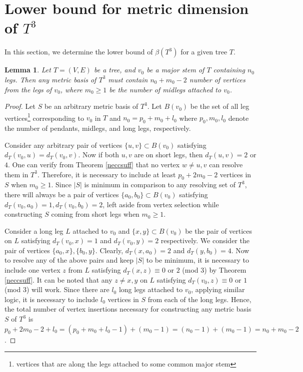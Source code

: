 \documentclass{article}
\newtheorem{lem}[thm]{Lemma}
\theoremstyle{definition}
\numberwithin{equation}{section}
\begin{document}
\section{Lower bound for metric dimension of $T^{3}$} 

\noindent In this section, we determine the lower bound of $\beta{(T^{3})}$ for a given tree $T$.


\begin{lem}\label{7}
Let $T=(V,E)$ be a tree, and $v_{0}$ be a major stem of $T$ containing $n_{0}$ legs. Then any metric basis of $T^{3}$ must contain $n_{0}+m_{0}-2$ number of vertices from the legs of $v_{0}$, where $m_{0}\geq 1$ be the number of midlegs attached to $v_{0}$.  
\end{lem}

\begin{proof}
Let $S$ be an arbitrary metric basis of $T^{3}$.  Let $B(v_{0})$ be the set of all leg vertices\footnote{vertices that are along the legs attached to some common major stem} corresponding to $v_{0}$ in $T$ and $n_{0}=p_{0}+m_{0}+l_{0}$ where $p_{0},m_{0},l_{0}$ denote the number of pendants, midlegs, and long legs, respectively.
\vspace{0.4em}

Consider any arbitrary pair of vertices $\{u,v\}\subset B(v_{0})$ satisfying $d_{T}(v_{0},u)=d_{T}(v_{0},v)$. Now if both $u,v$ are on short legs, then $d_{T}(u,v)=2$ or $4$. One can verify from Theorem \ref{neccsuff} that no vertex $w\neq u,v$ can resolve them in $T^{3}$. Therefore, it is necessary to include at least $p_{0}+2m_{0}-2$ vertices in $S$ when $m_{0}\geq 1$. Since $|S|$ is minimum in comparison to any resolving set of $T^{3}$, there will always be a pair of vertices $\{a_{0},b_{0}\}\subset B(v_{0})$ satisfying $d_{T}(v_{0},a_{0})=1, d_{T}(v_{0},b_{0})=2$, left aside from vertex selection while constructing $S$ coming from short legs when $m_{0}\geq 1$. 
  
\vspace{0.4em}
 Consider a long leg $L$ attached to $v_{0}$ and $\{x,y\}\subset B(v_{0})$ be the pair of vertices on $L$ satisfying $d_{T}(v_{0},x)=1$ and $d_{T}(v_{0},y)=2$ respectively.  We consider the pair of vertices $\{a_{0},x\},\{b_{0},y\}$. Clearly, $d_{T}(x,a_{0})=2$ and $d_{T}(y,b_{0})=4$. Now to resolve any of the above pairs and keep $|S|$ to be minimum, it is necessary to include one vertex $z$ from $L$ satisfying $d_{T}(x,z)\equiv 0$ or $2$ (mod $3$) by Theorem \ref{neccsuff}. It can be noted that any $z\neq x,y$ on $L$ satisfying $d_{T}(v_{0},z)\equiv 0$ or $1$ (mod $3$) will work. Since there are $l_{0}$ long legs attached to $v_{0}$, applying similar logic, it is necessary to include $l_{0}$ vertices in $S$ from each of the long legs. Hence, the total number of vertex insertions necessary for constructing any metric basis $S$ of $T^{3}$ is $p_{0}+2m_{0}-2+l_{0}=(p_{0}+m_{0}+l_{0}-1)+(m_{0}-1)=(n_{0}-1)+(m_{0}-1)=n_{0}+m_{0}-2$.
 \end{proof}
\end{document}
